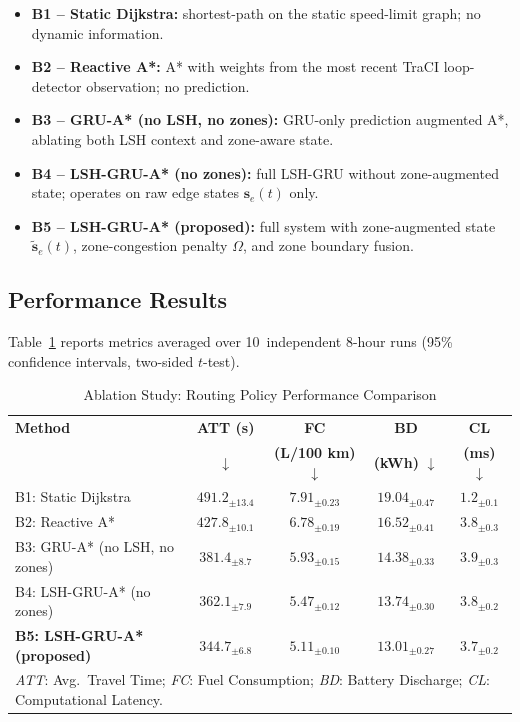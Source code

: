 \documentclass[journal,letterpaper,10pt]{IEEEtran}
\theoremstyle{definition}
\theoremstyle{remark}
\begin{document}
\begin{itemize}
  \item \textbf{B1 -- Static Dijkstra:} shortest-path on the
    static speed-limit graph; no dynamic information.
  \item \textbf{B2 -- Reactive A*:} A* with weights from the
    most recent TraCI loop-detector observation; no prediction.
  \item \textbf{B3 -- GRU-A* (no LSH, no zones):} GRU-only
    prediction augmented A*, ablating both LSH context and
    zone-aware state.
  \item \textbf{B4 -- LSH-GRU-A* (no zones):} full LSH-GRU
    without zone-augmented state; operates on raw edge states
    $\mathbf{s}_e(t)$ only.
  \item \textbf{B5 -- LSH-GRU-A* (proposed):} full system with
    zone-augmented state $\tilde{\mathbf{s}}_e(t)$, zone-congestion
    penalty $\Omega$, and zone boundary fusion.
\end{itemize}

\subsection{Performance Results}

Table~\ref{tab:ablation} reports metrics averaged over 10~independent
8-hour runs (95\% confidence intervals, two-sided $t$-test).

\begin{table}[!t]
\renewcommand{\arraystretch}{1.35}
\caption{Ablation Study: Routing Policy Performance Comparison}
\label{tab:ablation}
\centering
\setlength{\tabcolsep}{4pt}
\begin{tabular}{lcccc}
\toprule
\rowcolor{gray!15}
\textbf{Method}
  & \textbf{ATT (s)}
  & \textbf{FC}
  & \textbf{BD}
  & \textbf{CL} \\
\rowcolor{gray!15}
  & $\downarrow$
  & \textbf{(L/100 km)} $\downarrow$
  & \textbf{(kWh)} $\downarrow$
  & \textbf{(ms)} $\downarrow$ \\
\midrule
B1: Static Dijkstra
  & $491.2_{\pm13.4}$
  & $7.91_{\pm0.23}$
  & $19.04_{\pm0.47}$
  & $1.2_{\pm0.1}$ \\
B2: Reactive A*
  & $427.8_{\pm10.1}$
  & $6.78_{\pm0.19}$
  & $16.52_{\pm0.41}$
  & $3.8_{\pm0.3}$ \\
B3: GRU-A* (no LSH, no zones)
  & $381.4_{\pm8.7}$
  & $5.93_{\pm0.15}$
  & $14.38_{\pm0.33}$
  & $3.9_{\pm0.3}$ \\
B4: LSH-GRU-A* (no zones)
  & $362.1_{\pm7.9}$
  & $5.47_{\pm0.12}$
  & $13.74_{\pm0.30}$
  & $3.8_{\pm0.2}$ \\
\midrule
\rowcolor{NavyBlue!10}
\textbf{B5: LSH-GRU-A* (proposed)}
  & $\mathbf{344.7}_{\pm6.8}$
  & $\mathbf{5.11}_{\pm0.10}$
  & $\mathbf{13.01}_{\pm0.27}$
  & $\mathbf{3.7}_{\pm0.2}$ \\
\bottomrule
\multicolumn{5}{l}{%
  \footnotesize\textit{ATT}: Avg.\ Travel Time;\enspace
  \textit{FC}: Fuel Consumption;\enspace
  \textit{BD}: Battery Discharge;\enspace
  \textit{CL}: Computational Latency.}
\end{tabular}
\end{table}
\end{document}
